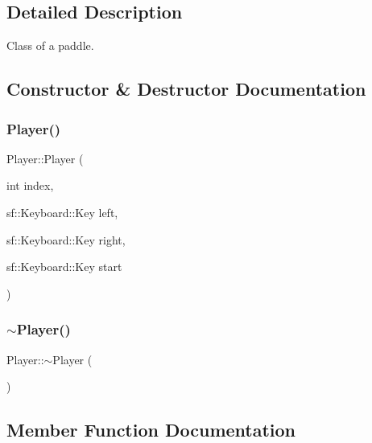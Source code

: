 \subsection{Detailed Description}
Class of a paddle. 

\subsection{Constructor \& Destructor Documentation}
\mbox{\label{class_player_aa1b5d40a7f5e26c7588b64ec515d7de7}} 
\subsubsection{\texorpdfstring{Player()}{Player()}}
{\footnotesize\ttfamily Player\+::\+Player (\begin{DoxyParamCaption}\item[{int}]{index,  }\item[{sf\+::\+Keyboard\+::\+Key}]{left,  }\item[{sf\+::\+Keyboard\+::\+Key}]{right,  }\item[{sf\+::\+Keyboard\+::\+Key}]{start }\end{DoxyParamCaption})\hspace{0.3cm}{\ttfamily [inline]}}

\mbox{\label{class_player_a749d2c00e1fe0f5c2746f7505a58c062}} 
\subsubsection{\texorpdfstring{$\sim$Player()}{~Player()}}
{\footnotesize\ttfamily Player\+::$\sim$\+Player (\begin{DoxyParamCaption}{ }\end{DoxyParamCaption})\hspace{0.3cm}{\ttfamily [inline]}}



\subsection{Member Function Documentation}
\mbox{\label{class_player_aaa0642fde01a4db5e9ee95693805ecda}} 
